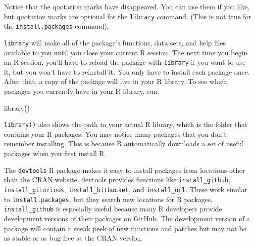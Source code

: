 \documentclass[
  letterpaper,
  DIV=11,
  numbers=noendperiod]{scrbook}
\newenvironment{Shaded}{\begin{snugshade}}{\end{snugshade}}
\newcommand{\FunctionTok}[1]{\textcolor[rgb]{0.28,0.35,0.67}{#1}}
\newcommand{\NormalTok}[1]{\textcolor[rgb]{0.00,0.23,0.31}{#1}}
\begin{document}
Notice that the quotation marks have disappeared. You can use them if
you like, but quotation marks are optional for the \texttt{library}
command. (This is not true for the \texttt{install.packages} command).

\texttt{library} will make all of the package's functions, data sets,
and help files available to you until you close your current R session.
The next time you begin an R session, you'll have to reload the package
with \texttt{library} if you want to use it, but you won't have to
reinstall it. You only have to install each package once. After that, a
copy of the package will live in your R library. To see which packages
you currently have in your R library, run:

\begin{Shaded}
\begin{Highlighting}[]
\FunctionTok{library}\NormalTok{()}
\end{Highlighting}
\end{Shaded}

\texttt{library()} also shows the path to your actual R library, which
is the folder that contains your R packages. You may notice many
packages that you don't remember installing. This is because R
automatically downloads a set of useful packages when you first install
R.

\begin{tcolorbox}[enhanced jigsaw, breakable, colback=white, colbacktitle=quarto-callout-tip-color!10!white, arc=.35mm, bottomrule=.15mm, coltitle=black, left=2mm, rightrule=.15mm, colframe=quarto-callout-tip-color-frame, leftrule=.75mm, opacitybacktitle=0.6, bottomtitle=1mm, toptitle=1mm, titlerule=0mm, opacityback=0, title=\textcolor{quarto-callout-tip-color}{\faLightbulb}\hspace{0.5em}{Install packages from (almost) anywhere}, toprule=.15mm]

The \texttt{devtools} R package makes it easy to install packages from
locations other than the CRAN website. devtools provides functions like
\texttt{install\_github}, \texttt{install\_gitorious},
\texttt{install\_bitbucket}, and \texttt{install\_url}. These work
similar to \texttt{install.packages}, but they search new locations for
R packages. \texttt{install\_github} is especially useful because many R
developers provide development versions of their packages on GitHub. The
development version of a package will contain a sneak peek of new
functions and patches but may not be as stable or as bug free as the
CRAN version.

\end{tcolorbox}
\end{document}
